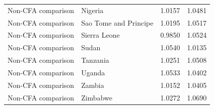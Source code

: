 \begin{table}
\begin{tabular}[t]{llrr}
Non-CFA comparison & Nigeria & 1.0157 & 1.0481\\
Non-CFA comparison & Sao Tome and Principe & 1.0195 & 1.0517\\
Non-CFA comparison & Sierra Leone & 0.9850 & 1.0524\\
\addlinespace
Non-CFA comparison & Sudan & 1.0540 & 1.0135\\
Non-CFA comparison & Tanzania & 1.0251 & 1.0508\\
Non-CFA comparison & Uganda & 1.0533 & 1.0402\\
Non-CFA comparison & Zambia & 1.0152 & 1.0405\\
Non-CFA comparison & Zimbabwe & 1.0272 & 1.0690\\
\bottomrule
\end{tabular}
\end{table}